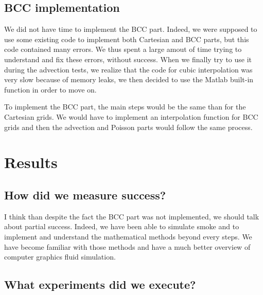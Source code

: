 \documentclass[accepted,single]{gipaper}
\begin{document}


\subsection{BCC implementation}
We did not have time to implement the BCC part. Indeed, we were supposed to use some existing code to implement both Cartesian and BCC parts, but this code contained many errors. We thus spent a large amout of time trying to understand and fix these errors, without success. When we finally try to use it during the advection tests, we realize that the code for cubic interpolation was very slow because of memory leaks, we then decided to use the Matlab built-in function in order to move on.

To implement the BCC part, the main steps would be the same than for the Cartesian grids. We would have to implement an interpolation function for BCC grids and then the advection and Poisson parts would follow the same process.

\section{Results}

\subsection{How did we measure success?}

I think than despite the fact the BCC part was not implemented, we should talk about partial success. Indeed, we have been able to simulate smoke and to implement and understand the mathematical methods beyond every steps. We have become familiar with those methods and have a much better overview of computer graphics fluid simulation.

\subsection{What experiments did we execute?}
\end{document}
